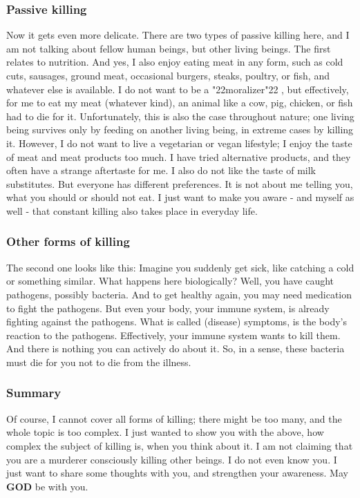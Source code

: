 \documentclass[12pt,a5paper]{article}
\newcommand{\God}[0]{\textbf{GOD}}
\newcommand{\q}[1]{\char"22{#1}\char"22 }
\begin{document}
	\subsubsection{Passive killing}
		Now it gets even more delicate.
		There are two types of passive killing here,
		and I am not talking about fellow human beings,
		but other living beings.
		The first relates to nutrition.
		And yes,
		I also enjoy eating meat in any form,
		such as cold cuts,
		sausages,
		ground meat,
		occasional burgers,
		steaks,
		poultry,
		or fish,
		and whatever else is available.
		I do not want to be a \q{moralizer},
		but effectively,
		for me to eat my meat (whatever kind),
		an animal like a cow,
		pig,
		chicken,
		or fish had to die for it.
		Unfortunately,
		this is also the case throughout nature;
		one living being survives only by feeding on another living being,
		in extreme cases by killing it.
		However,
		I do not want to live a vegetarian or vegan lifestyle;
		I enjoy the taste of meat and meat products too much.
		I have tried alternative products,
		and they often have a strange aftertaste for me.
		I also do not like the taste of milk substitutes.
		But everyone has different preferences.
		It is not about me telling you,
		what you should or should not eat.
		I just want to make you aware - and myself as well - that constant killing also takes place in everyday life.
		
	\subsubsection{Other forms of killing}
		The second one looks like this:
		Imagine you suddenly get sick,
		like catching a cold or something similar.
		What happens here biologically?
		Well,
		you have caught pathogens,
		possibly bacteria.
		And to get healthy again,
		you may need medication to fight the pathogens.
		But even your body,
		your immune system,
		is already fighting against the pathogens.
		What is called (disease) symptoms,
		is the body's reaction to the pathogens.
		Effectively,
		your immune system wants to kill them.
		And there is nothing you can actively do about it.
		So,
		in a sense,
		these bacteria must die for you not to die from the illness.

	\subsubsection{Summary}
		Of course,
		I cannot cover all forms of killing;
		there might be too many,
		and the whole topic is too complex.
		I just wanted to show you with the above,
		how complex the subject of killing is,
		when you think about it.
		I am not claiming that you are a murderer consciously killing other beings.
		I do not even know you.
		I just want to share some thoughts with you,
		and strengthen your awareness.
		May {\God} be with you.
\end{document}
